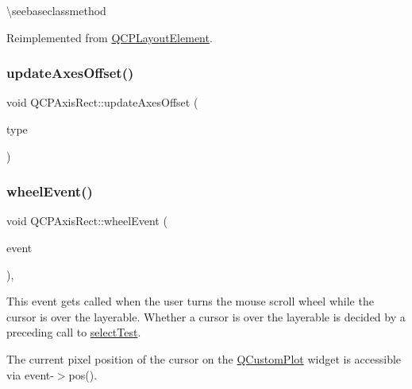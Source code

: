 \textbackslash{}seebaseclassmethod 

Reimplemented from \mbox{\hyperlink{class_q_c_p_layout_element_a929c2ec62e0e0e1d8418eaa802e2af9b}{Q\+C\+P\+Layout\+Element}}.

\mbox{\label{class_q_c_p_axis_rect_a6024ccdc74f5dc0e8a0fe482e5b28a20}} 
\subsubsection{\texorpdfstring{updateAxesOffset()}{updateAxesOffset()}}
{\footnotesize\ttfamily void Q\+C\+P\+Axis\+Rect\+::update\+Axes\+Offset (\begin{DoxyParamCaption}\item[{\mbox{\hyperlink{class_q_c_p_axis_ae2bcc1728b382f10f064612b368bc18a}{Q\+C\+P\+Axis\+::\+Axis\+Type}}}]{type }\end{DoxyParamCaption})\hspace{0.3cm}{\ttfamily [protected]}}

\mbox{\label{class_q_c_p_axis_rect_a93eeaa0c127d6d6fe8171b2455080262}} 
\subsubsection{\texorpdfstring{wheelEvent()}{wheelEvent()}}
{\footnotesize\ttfamily void Q\+C\+P\+Axis\+Rect\+::wheel\+Event (\begin{DoxyParamCaption}\item[{Q\+Wheel\+Event $\ast$}]{event }\end{DoxyParamCaption})\hspace{0.3cm}{\ttfamily [protected]}, {\ttfamily [virtual]}}

This event gets called when the user turns the mouse scroll wheel while the cursor is over the layerable. Whether a cursor is over the layerable is decided by a preceding call to \mbox{\hyperlink{class_q_c_p_layout_element_ae97f483cccedadbf18ea4525ef240ee4}{select\+Test}}.

The current pixel position of the cursor on the \mbox{\hyperlink{class_q_custom_plot}{Q\+Custom\+Plot}} widget is accessible via {\ttfamily event-\/$>$pos()}.

